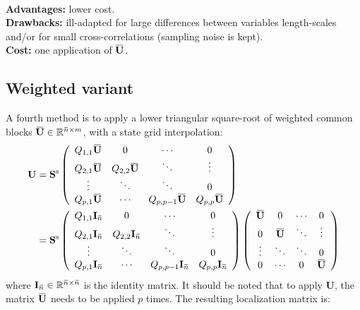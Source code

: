 \documentclass[12pt]{scrartcl}
\newcommand{\overbar}[1]{\mkern 1.5mu\overline{\mkern-1.5mu#1\mkern-1.5mu}\mkern 1.5mu}
\begin{document}
$  $\\
\textbf{Advantages:} lower cost.\\
\textbf{Drawbacks:} ill-adapted for large differences between variables length-scales and/or for small cross-correlations (sampling noise is kept).\\
\textbf{Cost:} one application of $\overbar{\mathbf{U}}$.

\subsection{Weighted variant}
A fourth method is to apply a lower triangular square-root of weighted common blocks $\overbar{\mathbf{U}} \in \mathbb{R}^{\overbar{n} \times m}$, with a state grid interpolation:
\begin{align}
\mathbf{U} & = \mathbf{S}^\mathrm{s} \left( \begin{array}{cccc}
Q_{1,1} \overbar{\mathbf{U}} & 0 & \cdots & 0 \\
Q_{2,1} \overbar{\mathbf{U}} & Q_{2,2} \overbar{\mathbf{U}} & \ddots & \vdots \\
\vdots & \ddots & \ddots & 0 \\
Q_{p,1} \overbar{\mathbf{U}} & \cdots & Q_{p,p-1} \overbar{\mathbf{U}} & Q_{p,p} \overbar{\mathbf{U}}
\end{array} \right) \\
 & = \mathbf{S}^\mathrm{s} \left( \begin{array}{cccc}
Q_{1,1} \mathbf{I}_{\overbar{n}} & 0 & \cdots & 0 \\
Q_{2,1} \mathbf{I}_{\overbar{n}} & Q_{2,2} \mathbf{I}_{\overbar{n}} & \ddots & \vdots \\
\vdots & \ddots & \ddots & 0 \\
Q_{p,1} \mathbf{I}_{\overbar{n}} & \cdots & Q_{p,p-1} \mathbf{I}_{\overbar{n}} & Q_{p,p} \mathbf{I}_{\overbar{n}}
\end{array} \right) \left( \begin{array}{cccc}
\overbar{\mathbf{U}} & 0 & \cdots & 0 \\
0 & \overbar{\mathbf{U}} & \ddots & \vdots \\
\vdots & \ddots & \ddots & 0 \\
0 & \cdots & 0 & \overbar{\mathbf{U}} 
\end{array} \right)
\end{align}
where $\mathbf{I}_{\overbar{n}} \in \mathbb{R}^{\overbar{n} \times \overbar{n}}$ is the identity matrix. It should be noted that to apply $\mathbf{U}$, the matrix $\overbar{\mathbf{U}}$ needs to be applied $p$ times. The resulting localization matrix is:
\end{document}
